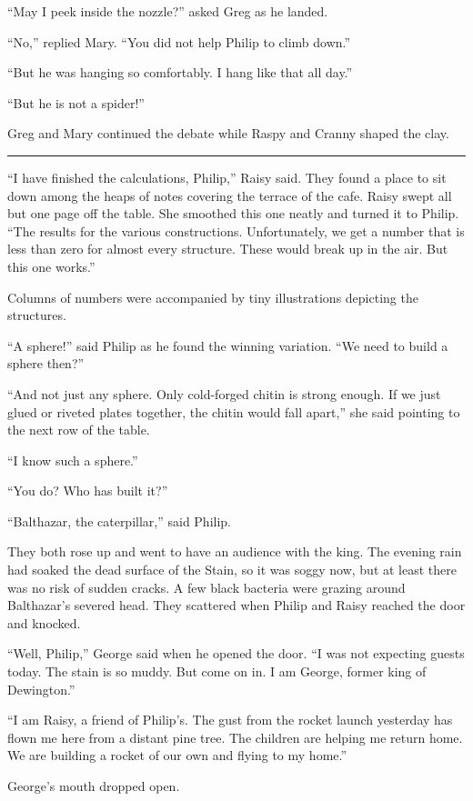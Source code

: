 \documentclass[10pt, draft]{memoir}
\renewcommand{\pfbreakdisplay}{\bigskip \ding{166} \bigskip}
\newcommand{\secbreak}{\fancybreak{\pfbreakdisplay}}
\begin{document}
``May I peek inside the nozzle?'' asked Greg as he landed.

``No,'' replied Mary. ``You did not help Philip to climb down.''

``But he was hanging so comfortably. I hang like that all day.''

``But he is not a spider!''

Greg and Mary continued the debate while Raspy and Cranny shaped the clay.

\secbreak

``I have finished the calculations, Philip,'' Raisy said. They found a place to
sit down among the heaps of notes covering the terrace of the cafe. Raisy swept
all but one page off the table. She smoothed this one neatly and turned it to
Philip. ``The results for the various constructions. Unfortunately, we get a
number that is less than zero for almost every structure. These would break up
in the air. But this one works.''

Columns of numbers were accompanied by tiny illustrations depicting the
structures.

``A sphere!'' said Philip as he found the winning variation. ``We need to build
a sphere then?''

``And not just any sphere. Only cold-forged chitin is strong enough. If we just
glued or riveted plates together, the chitin would fall apart,'' she said
pointing to the next row of the table.

``I know such a sphere.''

``You do? Who has built it?''

``Balthazar, the caterpillar,'' said Philip.

They both rose up and went to have an audience with the king. The evening rain
had soaked the dead surface of the Stain, so it was soggy now, but  at least
there was no risk of sudden cracks. A few black bacteria were grazing around
Balthazar's severed head. They scattered when Philip and Raisy reached the door
and knocked.

``Well, Philip,'' George said when he opened the door. ``I was not expecting
guests today. The stain is so muddy. But come on in. I am George, former king
of Dewington.''

``I am Raisy, a friend of Philip's. The gust from the rocket launch yesterday
has flown me here from a distant pine tree. The children are helping me return
home. We are building a rocket of our own and flying to my home.''

George's mouth dropped open.
\end{document}
